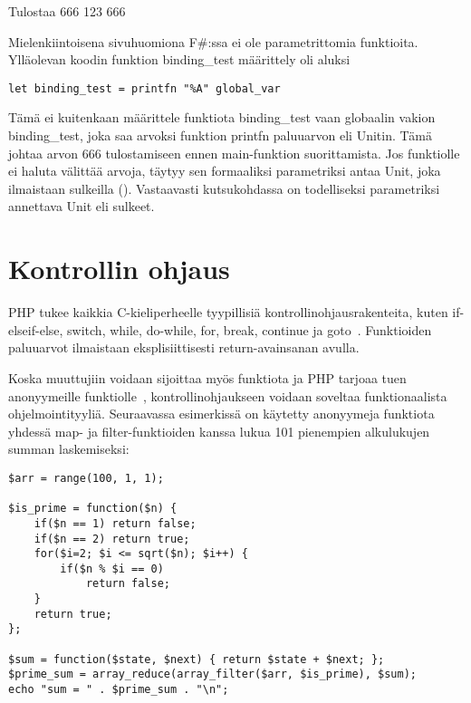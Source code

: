 Tulostaa 666 123 666

Mielenkiintoisena sivuhuomiona F\#:ssa ei ole parametrittomia funktioita. Ylläolevan koodin funktion binding_test määrittely oli aluksi

\begin{lstlisting}
let binding_test = printfn "%A" global_var
\end{lstlisting}

Tämä ei kuitenkaan määrittele funktiota binding_test vaan globaalin vakion binding_test, joka saa arvoksi funktion printfn paluuarvon eli Unitin. Tämä johtaa arvon 666 tulostamiseen ennen main-funktion suorittamista. Jos funktiolle ei haluta välittää arvoja, täytyy sen formaaliksi parametriksi antaa Unit, joka ilmaistaan sulkeilla (). Vastaavasti kutsukohdassa on  todelliseksi parametriksi annettava Unit eli sulkeet.



\section{Kontrollin ohjaus}

PHP tukee kaikkia C-kieliperheelle tyypillisiä kontrollinohjausrakenteita, kuten if-elseif-else, switch, while, do-while, for, break, continue ja goto~\cite{man_php_control}. Funktioiden paluuarvot ilmaistaan eksplisiittisesti return-avainsanan avulla.
\par
Koska muuttujiin voidaan sijoittaa myös funktiota ja PHP tarjoaa tuen anonyymeille funktiolle~\cite{man_php_anon}, kontrollinohjaukseen voidaan soveltaa funktionaalista ohjelmointityyliä. Seuraavassa esimerkissä on käytetty anonyymeja funktiota yhdessä map- ja filter-funktioiden kanssa lukua 101 pienempien alkulukujen summan laskemiseksi:

\lstset{language=PHP,
	basicstyle=\ttfamily,
	breaklines=true,
	columns=fullflexible}

\begin{lstlisting}
$arr = range(100, 1, 1);

$is_prime = function($n) {
    if($n == 1) return false;
    if($n == 2) return true;
    for($i=2; $i <= sqrt($n); $i++) {
        if($n % $i == 0)
            return false;
    }
    return true;
};

$sum = function($state, $next) { return $state + $next; };
$prime_sum = array_reduce(array_filter($arr, $is_prime), $sum);
echo "sum = " . $prime_sum . "\n";
\end{lstlisting}

